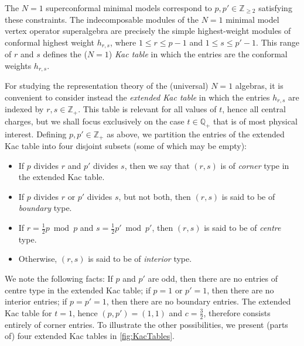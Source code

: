 \documentclass[a4paper,reqno,12pt]{report}
\theoremstyle{definition}
\numberwithin{equation}{section}
\newcommand{\ZZ}{\mathbb{Z}}
\newcommand{\QQ}{\mathbb{Q}}
\newcommand{\hw}{highest-weight}
\newcommand{\hwms}{\hw{} modules}
\renewcommand{\ge}{\geqslant}
\renewcommand{\le}{\leqslant}
\theoremstyle{plain}
\begin{document}
The $N=1$ superconformal minimal models \cite{EicMin85,BerSup85,FriSup85} correspond to $p,p' \in \ZZ_{\ge 2}$ satisfying these constraints. The indecomposable modules of the $N=1$ minimal model vertex operator superalgebra are precisely \cite{AdaRat97} the simple \hwms{} of conformal highest weight $h_{r,s}$, where $1 \le r \le p-1$ and $1 \le s \le p'-1$.  This range of $r$ and $s$ defines the ($N=1$) \emph{Kac table} in which the entries are the conformal weights $h_{r,s}$.

For studying the representation theory of the (universal) $N=1$ algebras, it is convenient to consider instead the \emph{extended Kac table} in which the entries $h_{r,s}$ are indexed by $r,s \in \ZZ_+$.  This table is relevant for all values of $t$, hence all central charges, but we shall focus exclusively on the case $t \in \QQ_+$ that is of most physical interest.  Defining $p,p' \in \ZZ_+$ as above, we partition the entries of the extended Kac table into four disjoint subsets (some of which may be empty):
\begin{itemize}
\item If $p$ divides $r$ and $p'$ divides $s$, then we say that $(r,s)$ is of \emph{corner} type in the extended Kac table.
\item If $p$ divides $r$ or $p'$ divides $s$, but not both, then $(r,s)$ is said to be of \emph{boundary} type.
\item If $r = \frac{1}{2} p \bmod{p}$ and $s = \frac{1}{2} p' \bmod{p'}$, then $(r,s)$ is said to be of \emph{centre} type.
\item Otherwise, $(r,s)$ is said to be of \emph{interior} type.
\end{itemize}
We note the following facts:  If $p$ and $p'$ are odd, then there are no entries of centre type in the extended Kac table; if $p=1$ or $p'=1$, then there are no interior entries; if $p=p'=1$, then there are no boundary entries.  The extended Kac table for $t=1$, hence $(p,p') = (1,1)$ and $c=\frac{3}{2}$, therefore consists entirely of corner entries.  To illustrate the other possibilities, we present (parts of) four extended Kac tables in \cref{fig:KacTables}.
\end{document}

